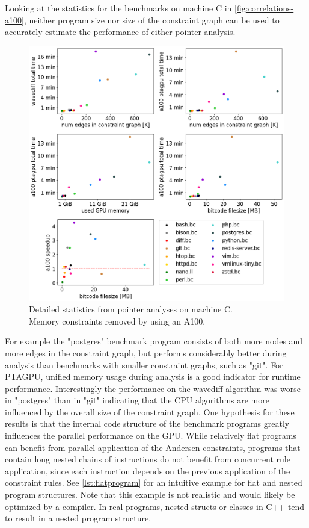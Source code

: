 Looking at the statistics for the benchmarks on machine C in \autoref{fig:correlations-a100}, neither program size nor size of the constraint graph can be used to accurately estimate the performance of either pointer analysis.
\begin{figure}
    \centering
    \includegraphics[width=.9\textwidth]{img/correlations-a100.png}
    \caption[Detailed statistics from machine C.]{Detailed statistics from pointer analyses on machine C.\\Memory constraints removed by using an A100.}
    \label{fig:correlations-a100}
\end{figure}
For example the "postgres" benchmark program consists of both more nodes and more edges in the constraint graph, but performs considerably better during analysis than benchmarks with smaller constraint graphs, such as "git".
For PTAGPU, unified memory usage during analysis is a good indicator for runtime performance.
Interestingly the performance on the wavediff algorithm was worse in "postgres" than in "git" indicating that the CPU algorithms are more influenced by the overall size of the constraint graph.
One hypothesis for these results is that the internal code structure of the benchmark programs greatly influences the parallel performance on the GPU.
While relatively flat programs can benefit from parallel application of the Andersen constraints, programs that contain long nested chains of instructions do not benefit from concurrent rule application, since each instruction depends on the previous application of the constraint rules. See \autoref{lst:flatprogram} for an intuitive example for flat and nested program structures. Note that this example is not realistic and would likely be optimized by a compiler. In real programs, nested structs or classes in C++ tend to result in a nested program structure.
